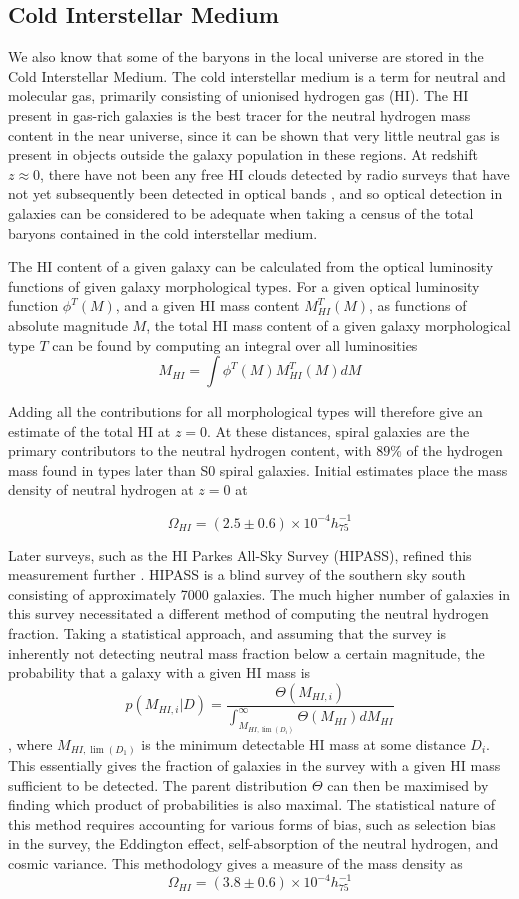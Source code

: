 \subsection{Cold Interstellar Medium}
We also know that some of the baryons in the local universe are stored in the Cold Interstellar Medium. The cold interstellar medium is a term for neutral and molecular gas, primarily consisting of unionised hydrogen gas (HI). The HI present in gas-rich galaxies is the best tracer for the neutral hydrogen mass content in the near universe, since it can be shown that very little neutral gas is present in objects outside the galaxy population in these regions. At redshift $z \approx 0$, there have not been any free HI clouds detected by radio surveys that have not yet subsequently been detected in optical bands \citep{1993ApJ...419..515R} , and so optical detection in galaxies can be considered to be adequate when taking a census of the total baryons contained in the cold interstellar medium. 
\par The HI content of a given galaxy can be calculated from the optical luminosity functions of given galaxy morphological types. For a given optical luminosity function $\phi^T(M)$, and a given HI mass content $M_{HI}^T(M)$, as functions of absolute magnitude $M$, the total HI mass content of a given galaxy morphological type $T$ can be found by computing an integral over all luminosities
$$M_{HI} = \int \phi^T(M) M_{HI}^T(M) dM $$

Adding all the contributions for all morphological types will therefore give an estimate of the total HI at $z=0$. At these distances, spiral galaxies are the primary contributors to the neutral hydrogen content, with $89\%$ of the hydrogen mass found in types later than S0 spiral galaxies. Initial estimates \citep{1993ApJ...419..515R} place the mass density of neutral hydrogen at $z=0$ at 

$$\Omega_{HI} = (2.5 \pm 0.6) \times 10^{-4} h_{75}^{-1} $$

Later surveys, such as the HI Parkes All-Sky Survey (HIPASS), refined this measurement further \citep{2003AJ....125.2842Z}. HIPASS is a blind survey of the southern sky south consisting of approximately 7000 galaxies. The much higher number of galaxies in this survey necessitated a different method of computing the neutral hydrogen fraction. Taking a statistical approach, and assuming that the survey is inherently not detecting neutral mass fraction below a certain magnitude, the probability that a galaxy with a given HI mass is 
$$ p(M_{HI,i}|D) = \frac{\Theta(M_{HI,i})}{\int_{M_{HI,\lim(D_i)}}^\infty \Theta(M_{HI}) dM_{HI}} $$
, where $M_{HI,\lim(D_1)}$ is the minimum detectable HI mass at some distance $D_i$. This essentially gives the fraction of galaxies in the survey with a given HI mass sufficient to be detected. The parent distribution $\Theta$ can then be maximised by finding which product of probabilities is also maximal. The statistical nature of this method requires accounting for various forms of bias, such as selection bias in the survey, the Eddington effect, self-absorption of the neutral hydrogen, and cosmic variance. This methodology gives a measure of the mass density as 
$$\Omega_{HI} = (3.8 \pm 0.6) \times 10^{-4} h_{75}^{-1} $$
